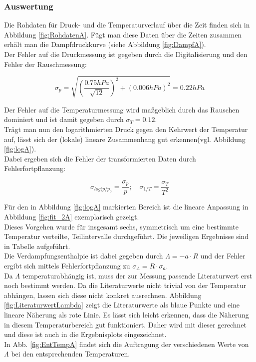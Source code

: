 \documentclass[12pt,a4paper]{article}
\begin{document}
\subsubsection{Auswertung}
Die Rohdaten für Druck- und die Temperaturverlauf über die Zeit finden sich in Abbildung \ref{fig:RohdatenA}. Fügt man diese Daten über die Zeiten zusammen erhält man die Dampfdruckkurve (siehe Abbildung \ref{fig:DampfA}).\\

Der Fehler auf die Druckmessung ist gegeben durch die Digitalisierung und den Fehler der Rauschmessung:

\begin{equation}
\sigma_p=\sqrt{\left(\frac{0.75 hPa}{\sqrt{12}}\right)^2+(0.006 hPa)^2}=0.22 hPa
\end{equation}

Der Fehler auf die Temperaturmessung wird maßgeblich durch das Rauschen dominiert und ist damit gegeben durch $\sigma_T=0.12$.\\
Trägt man nun den logarithmierten Druck gegen den Kehrwert der Temperatur auf, lässt sich der (lokale) lineare Zusammenhang gut erkennen(vgl. Abbildung \ref{fig:logA}).\\
Dabei ergeben sich die Fehler der transformierten Daten durch Fehlerfortpflanzung:

\begin{equation}
\sigma_{log(p/p_0}=\frac{\sigma_p}{p} ; \quad \sigma_{1/T}=\frac{\sigma_T}{T^2}
\end{equation}

Für den in Abbildung \ref{fig:logA} markierten Bereich ist die lineare Anpassung in Abbildung \ref{fig:fit_2A} exemplarisch gezeigt.\\


Dieses Vorgehen wurde für insgesamt sechs, symmetrisch um eine bestimmte Temperatur verteilte, Teilintervalle durchgeführt. Die jeweiligen Ergebnisse sind in Tabelle %
aufgeführt.\\
Die Verdampfungsenthalpie ist dabei gegeben durch $\Lambda=-a \cdot R$ und der Fehler ergibt sich mittels Fehlerfortpflanzung zu $\sigma_{\Lambda}=R \cdot \sigma_a$.\\
Da $\Lambda$ temperaturabhängig ist, muss der zur Messung passende Literaturwert erst noch bestimmt werden. Da die Literaturwerte nicht trivial von der Temperatur abhängen, lassen sich diese nicht konkret ausrechnen. Abbildung \ref{fig:LiteraturwertLambda} zeigt die Literaturwerte als blaue Punkte und eine lineare Näherung als rote Linie. Es lässt sich leicht erkennen, dass die Näherung in diesem Temperaturbereich gut funktioniert. Daher wird mit dieser gerechnet und diese ist auch in die Ergebnisplots eingezeichnet. \\
In Abb. \ref{fig:EntTempA} findet sich die Auftragung der verschiedenen Werte von $\Lambda$ bei den entsprechenden Temperaturen.
\end{document}
